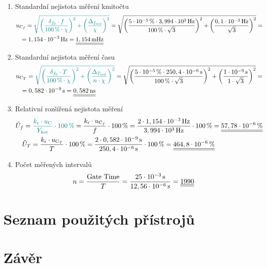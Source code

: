 \documentclass[a4paper, czech]{article}
\begin{document}
\begin{enumerate}
    \item Standardní nejistota měření kmitočtu
    \begin{multline*}
        u_{\text{C}_f} = \textcolor{teal}{\sqrt{\left(\frac{\delta_{f_0} \cdot f}{100\,\% \cdot \chi}\right)^2 + \left(\frac{\Delta_{f_\text{ind}}}{\chi}\right)^2}} = \sqrt{\left(\frac{5\cdot10^{-5}\,\% \cdot 3,994\cdot10^{3}\,\text{Hz}}{100\,\% \cdot \sqrt{3}}\right)^2 + \left(\frac{0,1\cdot10^{-3}\,\text{Hz}}{\sqrt{3}}\right)^2} = \hfill \\
        \ \ \ = 1,154\cdot10^{-3}\,\text{Hz} = \underline{\underline{1,154\,\text{mHz}}} \hfill
    \end{multline*}
    \item Standardní nejistota měření času
    \begin{multline*}
        u_{\text{C}_T} = \textcolor{teal}{\sqrt{\left(\frac{\delta_{f_0} \cdot T}{100\,\% \cdot \chi}\right)^2 + \left(\frac{\Delta_{T_\text{ind}}}{n \cdot \chi}\right)^2}} = \sqrt{\left(\frac{5\cdot10^{-5}\,\% \cdot 250,4\cdot10^{-6}\,\text{s}}{100\,\% \cdot \sqrt{3}}\right)^2 + \left(\frac{1\cdot10^{-9}\,\text{s}}{1 \cdot \sqrt{3}}\right)^2} = \hfill \\
        \ \ \ = 0,582\cdot10^{-9}\,\text{s} = \underline{\underline{0,582\,\text{ns}}} \hfill
    \end{multline*}
    \item Relativní rozšířená nejistota měření
    \begin{multline*}
        \tilde{U}_f = \textcolor{teal}{\frac{k_\text{r} \cdot u_\text{C}}{Y_\text{kor}} \cdot 100\,\%} = \frac{k_\text{r} \cdot u_{\text{C}_f}}{f} \cdot 100\,\% = \frac{2 \cdot 1,154\cdot10^{-3}\,\text{Hz}}{3,994\cdot10^{3}\,\text{Hz}} \cdot 100\,\% = \underline{\underline{57,78\cdot10^{-6}\,\%}} \hfill \\
        \ \ \ \tilde{U}_T = \frac{k_\text{r} \cdot u_{\text{C}_T}}{T} \cdot 100\,\% = \frac{2 \cdot 0,582\cdot10^{-9}\,\text{s}}{250,4\cdot10^{-6}\,\text{s}} \cdot 100\,\% = \underline{\underline{464,8\cdot10^{-6}\,\%}} \hfill
    \end{multline*}
    \item Počet měřených intervalů
    \begin{multline*}
        n = \frac{\text{Gate Time}}{T} = \frac{25\cdot10^{-3}\,\text{s}}{12,56\cdot10^{-6}\,\text{s}} = \underline{\underline{1990}} \hfill
    \end{multline*}
\end{enumerate}

\section{Seznam použitých přístrojů}

\section{Závěr}
\end{document}
